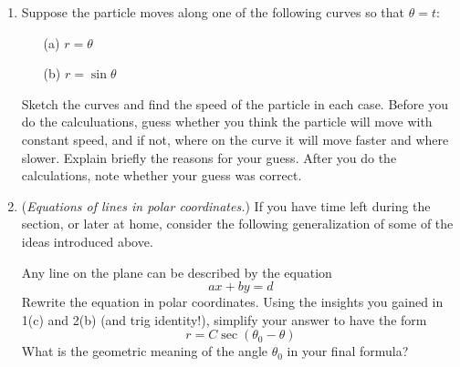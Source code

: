 \documentclass[12pt]{article}
\begin{document}
\begin{enumerate}
\item Suppose the particle moves along one of the following curves so that 
$\theta = t$:
\begin{enumerate}
\item[(a)] $r = \theta$
\item[(b)] $r = \sin\theta$
\end{enumerate}
 Sketch the curves and find the speed of the particle in each case.  Before you do 
the calculuations, guess whether you think the particle will move with 
constant speed, and if not, where on the curve it will move faster and 
where slower.  Explain briefly the reasons for your guess. After you do 
the calculations, note whether your guess was correct.  



\item (\textit{Equations of lines in polar coordinates.}) If you have time left during the section, or later at home, 
consider the following generalization of some of the ideas introduced above.


Any line on the plane can be described by the equation  $$ax + by = d$$ 
Rewrite the equation in polar coordinates. Using the insights you
gained in 1(c) and 2(b) (and trig identity!), 
simplify   your answer  to have the form  $$r = C\sec (\theta_0 - \theta)$$  
What is the geometric meaning of the angle $\theta_0$ in your  final formula?


\end{enumerate}
\end{document}
